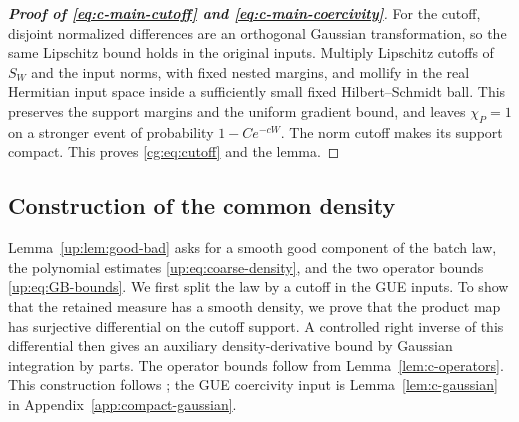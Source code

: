 \documentclass[11pt]{article}
\numberwithin{equation}{section}
\theoremstyle{remark}
\begin{document}
\begin{proof}[\textbf{Proof of \eqref{eq:c-main-cutoff} and \eqref{eq:c-main-coercivity}}]
For the cutoff, disjoint normalized differences are an orthogonal
Gaussian transformation, so the same Lipschitz bound holds in the
original inputs. Multiply Lipschitz cutoffs of \(S_W\) and the
input norms, with fixed nested margins, and mollify in the real
Hermitian input space inside a sufficiently small fixed
Hilbert--Schmidt ball. This preserves the support margins and the
uniform gradient bound, and leaves \(\chi_P=1\) on a stronger event
of probability \(1-Ce^{-cW}\). The norm cutoff makes its support
compact. This proves \eqref{cg:eq:cutoff} and the lemma.
\end{proof}

\subsection{Construction of the common density}
\label{sec:c-component-proof}

Lemma~\ref{up:lem:good-bad} asks for a smooth good component of the
batch law, the polynomial estimates \eqref{up:eq:coarse-density},
and the two operator bounds \eqref{up:eq:GB-bounds}. We first split
the law by a cutoff in the GUE inputs. To show that the retained
measure has a smooth density, we prove that the product map has
surjective differential on the cutoff support. A controlled right
inverse of this differential then gives an auxiliary density-derivative bound
by Gaussian integration by parts. The operator bounds follow from
Lemma~\ref{lem:c-operators}.
This construction follows \cite[Proposition~4.1, Lemma~4.2 and
Section~4.3]{Drogin}; the GUE coercivity input is
Lemma~\ref{lem:c-gaussian} in Appendix~\ref{app:compact-gaussian}.
\end{document}

